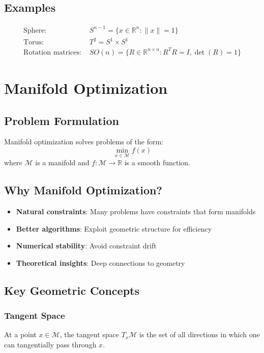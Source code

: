 \documentclass[11pt]{article}
\begin{document}
\subsection{Examples}
\begin{align*}
    \text{Sphere: } & S^{n-1} = \{x \in \mathbb{R}^n : \|x\| = 1\} \\
    \text{Torus: } & T^2 = S^1 \times S^1 \\
    \text{Rotation matrices: } & SO(n) = \{R \in \mathbb{R}^{n\times n} : R^T R = I, \det(R) = 1\}
\end{align*}

\section{Manifold Optimization}

\subsection{Problem Formulation}
Manifold optimization solves problems of the form:
\[
\min_{x \in \mathcal{M}} f(x)
\]
where $\mathcal{M}$ is a manifold and $f: \mathcal{M} \to \mathbb{R}$ is a smooth function.

\subsection{Why Manifold Optimization?}
\begin{itemize}
    \item \textbf{Natural constraints}: Many problems have constraints that form manifolds
    \item \textbf{Better algorithms}: Exploit geometric structure for efficiency
    \item \textbf{Numerical stability}: Avoid constraint drift
    \item \textbf{Theoretical insights}: Deep connections to geometry
\end{itemize}

\subsection{Key Geometric Concepts}

\subsubsection{Tangent Space}
At a point $x \in \mathcal{M}$, the tangent space $T_x\mathcal{M}$ is the set of all directions in which one can tangentially pass through $x$.
\end{document}
